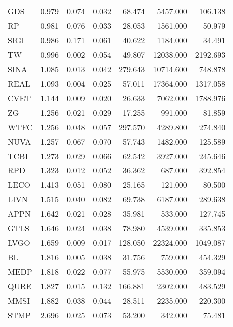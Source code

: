 \begin{table}
\begin{tabular}{lrrrrrr}
GDS    &       0.979 &     0.074 &    0.032 &  68.474 &  5457.000 &  106.138 \\
RP     &       0.981 &     0.076 &    0.033 &  28.053 &  1561.000 &   50.979 \\
SIGI   &       0.986 &     0.171 &    0.061 &  40.622 &  1184.000 &   34.491 \\
TW     &       0.996 &     0.002 &    0.054 &  49.807 & 12038.000 & 2192.693 \\
SINA   &       1.085 &     0.013 &    0.042 & 279.643 & 10714.600 &  748.878 \\
REAL   &       1.093 &     0.004 &    0.025 &  57.011 & 17364.000 & 1317.058 \\
CVET   &       1.144 &     0.009 &    0.020 &  26.633 &  7062.000 & 1788.976 \\
ZG     &       1.256 &     0.021 &    0.029 &  17.255 &   991.000 &   81.859 \\
WTFC   &       1.256 &     0.048 &    0.057 & 297.570 &  4289.800 &  274.840 \\
NUVA   &       1.257 &     0.067 &    0.070 &  57.743 &  1482.000 &  125.589 \\
TCBI   &       1.273 &     0.029 &    0.066 &  62.542 &  3927.000 &  245.646 \\
RPD    &       1.323 &     0.012 &    0.052 &  36.362 &   687.000 &  392.854 \\
LECO   &       1.413 &     0.051 &    0.080 &  25.165 &   121.000 &   80.500 \\
LIVN   &       1.515 &     0.040 &    0.082 &  69.738 &  6187.000 &  289.638 \\
APPN   &       1.642 &     0.021 &    0.028 &  35.981 &   533.000 &  127.745 \\
GTLS   &       1.646 &     0.024 &    0.038 &  78.980 &  4539.000 &  335.853 \\
LVGO   &       1.659 &     0.009 &    0.017 & 128.050 & 22324.000 & 1049.087 \\
BL     &       1.816 &     0.005 &    0.038 &  31.756 &   759.000 &  454.329 \\
MEDP   &       1.818 &     0.022 &    0.077 &  55.975 &  5530.000 &  359.094 \\
QURE   &       1.827 &     0.015 &    0.132 & 166.881 &  2302.000 &  483.529 \\
MMSI   &       1.882 &     0.038 &    0.044 &  28.511 &  2235.000 &  220.300 \\
STMP   &       2.696 &     0.025 &    0.073 &  53.200 &   342.000 &   75.481 \\
\bottomrule
\end{tabular}
\end{table}

